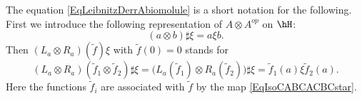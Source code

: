 \begin{remark}
    The equation \eqref{EqLeibnitzDerrAbiomolule} is a short notation for the following. First we introduce the following representation of \(A\otimes A^{op}\) on \(\hH\):
    \begin{equation}
        (a\otimes b)\sharp \xi=a\xi b.
    \end{equation}
    Then \(  (L_a\otimes R_a)(\tilde f)\xi \) with \(\tilde f(0)=0\) stands for
    \begin{equation}        \label{EqLaRattfsurxi}
        (L_a\otimes R_a)(\tilde f_1\otimes \tilde f_2 )\sharp\xi=\Big( L_a(\tilde f_1)\otimes R_a( \tilde f_2) \Big)\sharp\xi=\tilde f_1(a)\xi\tilde f_2(a).
    \end{equation}
    Here the functions \(\tilde f_i\) are associated with \(\tilde f\) by the map \eqref{EqIsoCABCACBCstar}.
\end{remark}

